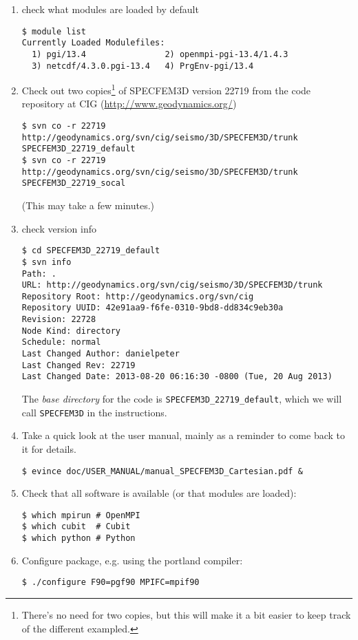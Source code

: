 \documentclass[10pt,fleqn,letterpaper]{article}
\begin{document}
\begin{enumerate}
\item check what modules are loaded by default
\begin{lstlisting}
$ module list
Currently Loaded Modulefiles:
  1) pgi/13.4                2) openmpi-pgi-13.4/1.4.3
  3) netcdf/4.3.0.pgi-13.4   4) PrgEnv-pgi/13.4
\end{lstlisting}

\item Check out two copies\footnote{There's no need for two copies, but this will make it a bit easier to keep track of the different exampled.} of SPECFEM3D version 22719 from the code repository at CIG (\url{http://www.geodynamics.org/})
%
\begin{lstlisting}
$ svn co -r 22719 http://geodynamics.org/svn/cig/seismo/3D/SPECFEM3D/trunk SPECFEM3D_22719_default
$ svn co -r 22719 http://geodynamics.org/svn/cig/seismo/3D/SPECFEM3D/trunk SPECFEM3D_22719_socal
\end{lstlisting}
%
(This may take a few minutes.)

\item check version info
%
\begin{lstlisting}
$ cd SPECFEM3D_22719_default
$ svn info
Path: .
URL: http://geodynamics.org/svn/cig/seismo/3D/SPECFEM3D/trunk
Repository Root: http://geodynamics.org/svn/cig
Repository UUID: 42e91aa9-f6fe-0310-9bd8-dd834c9eb30a
Revision: 22728
Node Kind: directory
Schedule: normal
Last Changed Author: danielpeter
Last Changed Rev: 22719
Last Changed Date: 2013-08-20 06:16:30 -0800 (Tue, 20 Aug 2013)
\end{lstlisting}

The {\em base directory} for the code is \verb+SPECFEM3D_22719_default+, which we will call \verb+SPECFEM3D+ in the instructions.

\item Take a quick look at the user manual, mainly as a reminder to come back to it for details.
%
\begin{lstlisting}
$ evince doc/USER_MANUAL/manual_SPECFEM3D_Cartesian.pdf &
\end{lstlisting}

\item Check that all software is available (or that modules are loaded):
\begin{lstlisting}
$ which mpirun # OpenMPI
$ which cubit  # Cubit
$ which python # Python
\end{lstlisting}

\item Configure package, e.g. using the portland compiler:
\begin{lstlisting}
$ ./configure F90=pgf90 MPIFC=mpif90
\end{lstlisting}


\end{enumerate}
\end{document}
